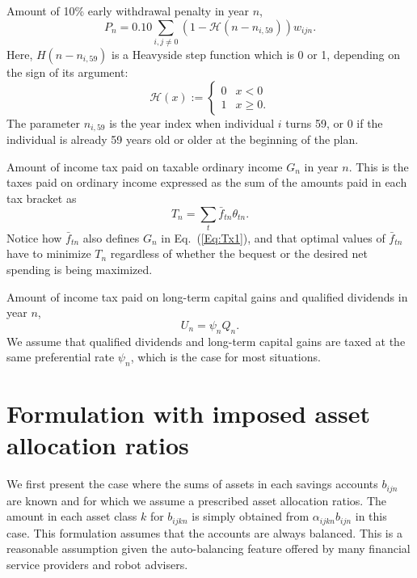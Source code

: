 \documentclass{report}[fleqn,12pt]
\begin{document}
\begin{description}[leftmargin=4em,style=multiline]
\item [$P_n$]
	Amount of 10\% early withdrawal penalty in year $n$,
	\begin{equation}
		\label{Eq:PenTax0}
		P_n = 0.10 \sum_{i, j\neq0} (1 - \mathcal{H}(n - n_{i,59})) w_{ijn}.
	\end{equation}
        Here, $H(n - n_{i, 59})$ is a Heavyside step function which is 0 or 1, depending on the sign of
        its argument:
	\begin{equation}
	\mathcal{H}(x) :=
	\begin{cases}
         0 & x < 0 \\
         1 & x \geq 0.
	\end{cases}
	\end{equation}
        The parameter $n_{i, 59}$ is the year index when individual $i$ turns 59,
	or 0 if the individual is already 59 years old or older at the beginning of the plan.

\item [$T_n$]
	Amount of income tax paid on taxable ordinary income $G_n$ in year $n$.
	This is the taxes paid on ordinary income expressed as the sum of the amounts
	paid in each tax bracket as
	\begin{equation}
		\label{Eq:IncTax1}
		T_n = \sum_t \bar{f}_{tn}\theta_{tn}.
	\end{equation}
	Notice how $\bar{f}_{tn}$ also defines $G_n$ in Eq.~(\ref{Eq:Tx1}), and that optimal
	values of $\bar{f}_{tn}$ have to minimize $T_n$ regardless of whether the bequest or the desired
	net spending is being maximized.

\item [$U_n$]
	Amount of income tax paid on long-term capital gains and qualified dividends in year $n$,
	\begin{equation}
		U_n = \psi_n Q_n.
	\end{equation}
	We assume that qualified dividends and long-term
	capital gains are taxed at the same preferential rate $\psi_n$, which is the case for most situations.

\end{description}

\chapter{Formulation with imposed asset allocation ratios}
We first present the case where the sums of assets in each savings accounts $b_{ijn}$ are known
and for which we assume a prescribed asset allocation ratios.
The amount in each asset class $k$ for $b_{ijkn}$ is simply obtained
from $\alpha_{ijkn} b_{ijn}$ in this case.
This formulation assumes that the accounts are always balanced. This is
a reasonable assumption given the auto-balancing feature offered by many financial service
providers and robot advisers.
\end{document}
